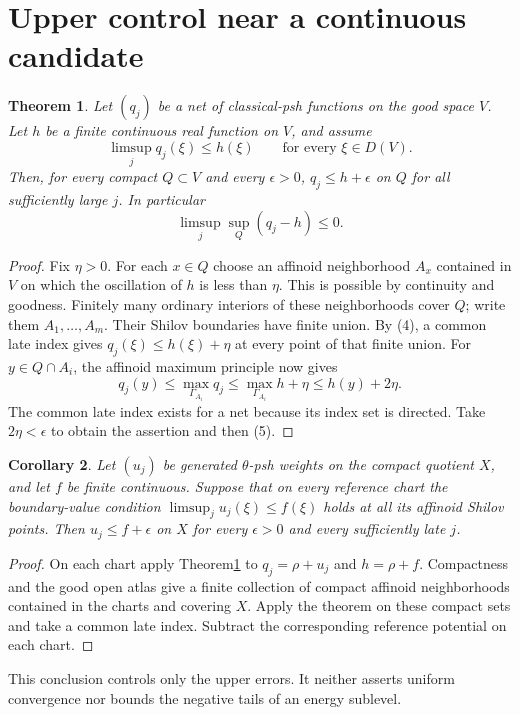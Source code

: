 \documentclass[11pt]{article}
\newtheorem{theorem}{Theorem}
\newtheorem{corollary}[theorem]{Corollary}
\begin{document}
\section{Upper control near a continuous candidate}
\begin{theorem}\label{Hartogs}
Let $(q_j)$ be a net of classical-psh functions on the good space $V$.
Let $h$ be a finite continuous real function on $V$, and assume
\[
 \limsup_j q_j(\xi)\le h(\xi)\qquad\text{for every }\xi\in D(V).
 \tag{4}
\]
Then, for every compact $Q\subset V$ and every $\epsilon>0$,
$q_j\le h+\epsilon$ on $Q$ for all sufficiently large $j$.
In particular
\[
 \limsup_j\sup_Q(q_j-h)\le0.
 \tag{5}
\]
\end{theorem}
\begin{proof}
Fix $\eta>0$. For each $x\in Q$ choose an affinoid neighborhood $A_x$
contained in $V$ on which the oscillation of $h$ is less than $\eta$.
This is possible by continuity and goodness. Finitely many ordinary
interiors of these neighborhoods cover $Q$; write them $A_1,\ldots,A_m$.
Their Shilov boundaries have finite union. By (4), a common late index
gives $q_j(\xi)\le h(\xi)+\eta$ at every point of that finite union.
For $y\in Q\cap A_i$, the affinoid maximum principle now gives
\[
 q_j(y)\le\max_{\Gamma_{A_i}}q_j
 \le\max_{\Gamma_{A_i}}h+\eta
 \le h(y)+2\eta.
\]
The common late index exists for a net because its index set is directed.
Take $2\eta<\epsilon$ to obtain the assertion and then (5).
\end{proof}

\begin{corollary}\label{weighted}
Let $(u_j)$ be generated $\theta$-psh weights on the compact quotient
$X$, and let $f$ be finite continuous. Suppose that on every reference
chart the boundary-value condition
$\limsup_j u_j(\xi)\le f(\xi)$ holds at all its affinoid Shilov points.
Then $u_j\le f+\epsilon$ on $X$ for every $\epsilon>0$ and every
sufficiently late $j$.
\end{corollary}
\begin{proof}
On each chart apply Theorem\ref{Hartogs} to $q_j=\rho+u_j$ and
$h=\rho+f$. Compactness and the good open atlas give a finite collection
of compact affinoid neighborhoods contained in the charts and covering
$X$. Apply the theorem on these compact sets and take a common late
index. Subtract the corresponding reference potential on each chart.
\end{proof}
This conclusion controls only the upper errors. It neither asserts
uniform convergence nor bounds the negative tails of an energy sublevel.
\end{document}
